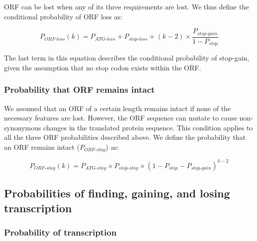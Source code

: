 \documentclass[12pt,a4paper]{article}
\begin{document}
ORF can be lost when any of its three requirements are lost. We thus define the conditional probability of ORF loss as:

\begin{equation}
P_\textit{ORF-loss}(k) = P_\textit{ATG-loss} + P_\textit{stop-loss} + (k-2)\times \frac{P_\textit{stop-gain}}{1-P_\textit{stop}}
\label{eqorfloss}
\end{equation}

The last term in this equation describes the conditional probability of stop-gain, given the assumption that no stop codon exists within the ORF.

\subsubsection{Probability that ORF remains intact}

We assumed that an ORF of a certain length remains intact if none of the necessary features are lost. However, the ORF sequence can mutate to cause non-synonymous changes in the translated protein sequence. This condition applies to all the three ORF probabilities described above. We define the probability that an ORF remains intact ($P_\textit{ORF-stay}$) as:

\begin{equation}
P_\textit{ORF-stay}(k) = P_\textit{ATG-stay} \times P_\textit{stop-stay} \times (1 - P_\textit{stop} - P_\textit{stop-gain})^{k-2}
\label{eqorfstay}
\end{equation}

\subsection{Probabilities of finding, gaining, and losing transcription}

\label{methRNA}

\subsubsection{Probability of transcription}
\end{document}
